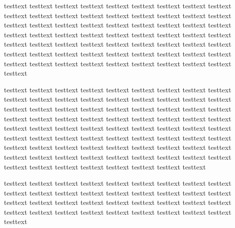 \documentclass[11pt]{article}
\begin{document}
testtext testtext testtext testtext testtext testtext testtext testtext testtext testtext testtext testtext testtext testtext testtext testtext testtext testtext testtext testtext testtext testtext testtext testtext testtext testtext testtext testtext testtext testtext
    testtext testtext testtext testtext testtext testtext testtext testtext testtext testtext testtext testtext testtext testtext testtext testtext testtext testtext testtext
    testtext testtext testtext testtext testtext testtext testtext testtext testtext testtext testtext testtext testtext testtext testtext


    testtext testtext testtext testtext testtext testtext testtext testtext testtext testtext testtext testtext testtext testtext testtext testtext testtext testtext testtext
    testtext testtext testtext testtext testtext testtext testtext testtext testtext testtext testtext testtext testtext testtext testtext testtext testtext testtext testtext testtext testtext testtext testtext testtext testtext testtext testtext testtext testtext testtext testtext testtext testtext testtext testtext testtext testtext testtext testtext testtext testtext testtext testtext
    testtext testtext testtext testtext testtext testtext testtext testtext testtext testtext testtext testtext testtext testtext testtext testtext testtext testtext

    testtext testtext testtext testtext testtext testtext testtext testtext testtext testtext testtext testtext testtext testtext testtext testtext
    testtext testtext testtext testtext testtext testtext testtext testtext testtext testtext testtext testtext testtext testtext
    testtext testtext testtext testtext testtext testtext testtext
\end{document}
